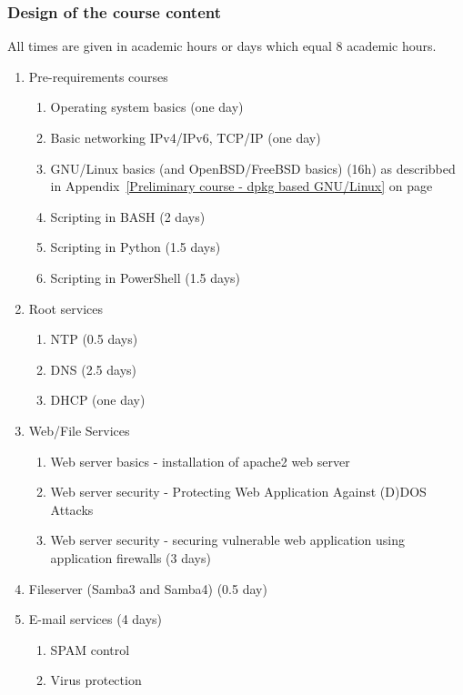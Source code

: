 \subsubsection{Design of the course content}
All times are given in academic hours or days which equal 8 academic hours.
\begin{enumerate}[label=Hands-on block \arabic*.,leftmargin=*]
  \item Pre-requirements courses
    \begin{enumerate}[label=LAB \arabic*.,leftmargin=*]
  	\item Operating system basics (one day)
  	\item Basic networking IPv4/IPv6, TCP/IP (one day)
  	\item GNU/Linux basics (and OpenBSD/FreeBSD basics) (16h) as describbed in Appendix~\ref{Preliminary course - dpkg based GNU/Linux} on page~\pageref{Preliminary course - dpkg based GNU/Linux}
  	\item Scripting in BASH (2 days)
  	\item Scripting in Python (1.5 days)
  	\item Scripting in PowerShell (1.5 days)
  \end{enumerate}
  \item Root services
  \begin{enumerate}[label=LAB \arabic*.,leftmargin=*]
  	\item NTP (0.5 days)
  	\item DNS (2.5 days)
  	\item DHCP (one day)
  \end{enumerate}
  \item Web/File Services
    \begin{enumerate}[label=LAB \arabic*.,leftmargin=*]
    \item Web server basics - installation of apache2 web server
  	\item Web server security - Protecting Web Application Against
(D)DOS Attacks
  	\item Web server security - securing vulnerable web application using application firewalls (3 days)
  	\end{enumerate}
  	\item Fileserver (Samba3 and Samba4) (0.5 day)
    \item E-mail services (4 days)
    \begin{enumerate}[label=LAB \arabic*.,leftmargin=*]
  		\item SPAM control
	  	\item Virus protection

\end{enumerate}
\end{enumerate}
